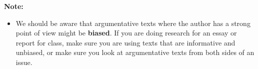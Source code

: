 \documentclass[12pt]{article}
\begin{document}
\vspace{1em}

\begin{tcolorbox}[colframe=black!40, colback=gray!5, 
coltitle=black, colbacktitle=black!20, fonttitle=\bfseries\Large, 
title=Additional Notes, halign title=center, left=5pt, right=5pt, top=5pt, bottom=15pt]
\textbf{Note:}
\begin{itemize}
    \item We should be aware that argumentative texts where the author has a strong point of view might be \textbf{biased}. If you are doing research for an essay or report for class, make sure you are using texts that are informative and unbiased, or make sure you look at argumentative texts from both sides of an issue.
\end{itemize}
\end{tcolorbox}

\vspace{1em}
\end{document}
